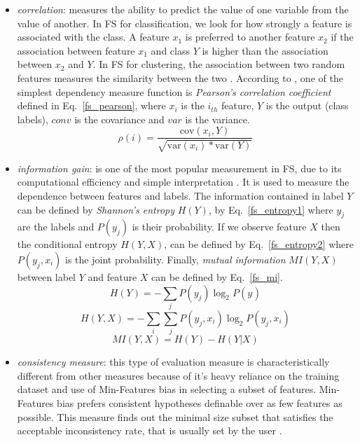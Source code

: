 \begin{itemize}
  \item \textit{correlation}: measures the ability to predict the value of one variable from the value of another. In FS for classification, we look for how strongly a feature is associated with the class. A feature $x_{1}$ is preferred to another feature $x_{2}$ if the association between feature $x_{1}$ and class $Y$ is higher than the association between $x_{2}$ and $Y$. In FS for clustering, the association between two random features measures the similarity between the two \citep{liu2005toward}. According to \citet{guyon2003introduction}, one of the simplest dependency measure function is \textit{Pearson's correlation coefficient} defined in Eq.~\ref{fs_pearson}, where $x_{i}$ is the $i_{th}$ feature, $Y$ is the output (class labels), $conv$ is the covariance and $var$ is the variance.
  \begin{equation}\label{fs_pearson}
    \rho(i) = \frac{\text{cov}(x_{i},Y)}{\sqrt{\text{var}(x_{i})*\text{var}(Y)}}
  \end{equation}
  \item \textit{information gain}: is one of the most popular measurement in FS, due to its computational efficiency and simple interpretation \citep{tang2014feature}. It is used to measure the dependence between features and labels. The information contained in label $Y$ can be defined by \textit{Shannon's entropy} $H(Y)$, by Eq.~\ref{fs_entropy1} where $y_{j}$ are the labels and $P(y_{j})$ is their probability. If we observe feature $X$ then the conditional entropy $H(Y, X)$, can be defined by Eq.~\ref{fs_entropy2} where $P(y_{j},x_{i})$ is the joint probability. Finally, \textit{mutual information} $MI(Y,X)$ between label $Y$ and feature $X$ can be defined by Eq.~\ref{fs_mi}.
  \begin{equation}\label{fs_entropy1}
    H(Y) = -\sum_j P(y_{j})\log_{2} P(y_{})
  \end{equation}  
  \begin{equation}\label{fs_entropy2}
    H(Y, X) = -\sum_i\sum_j P(y_{j},x_{i})\log_{2}P(y_{j},x_{i})
  \end{equation}
  \begin{equation}\label{fs_mi}
    MI(Y,X) = H(Y) - H(Y|X)
  \end{equation}
  \item \textit{consistency measure}: this type of evaluation measure is characteristically different from other measures because of it's heavy reliance on the training dataset and use of Min-Features bias in selecting a subset of features. Min-Features bias prefers consistent hypotheses definable over as few features as possible. This measure finds out the minimal size subset that satisfies the acceptable inconsistency rate, that is usually set by the user \citep{liu2005toward}.
\end{itemize}

